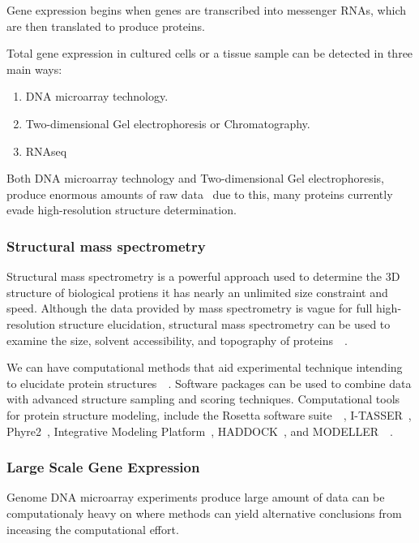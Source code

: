 \documentclass[]{final_report}
\begin{document}
Gene expression begins when genes are transcribed into messenger RNAs, which are then translated to produce proteins. 

Total gene expression in cultured cells or a tissue sample can be detected in three main ways:

\begin{enumerate}
    \item DNA microarray technology.
    \item Two-dimensional Gel electrophoresis or Chromatography.
    \item RNAseq
\end{enumerate}

Both DNA microarray technology and Two-dimensional Gel electrophoresis, produce enormous amounts of raw data~\cite{zvelebil_understanding_2008} due to this, many proteins currently evade high-resolution structure determination.


\subsubsection{Structural mass spectrometry}
Structural mass spectrometry is a powerful approach used to determine the 3D structure of biological protiens it has nearly an unlimited size constraint and speed. Although the data provided by mass spectrometry is vague for full high-resolution structure elucidation, structural mass spectrometry can be used to examine the size, solvent accessibility, and topography of proteins~\cite{limpikirati_covalent_2018}~\cite{liu_mass_2020}.

We can have computational methods that aid experimental technique intending to elucidate protein structures~\cite{seffernick_hybrid_2020}~\cite{leman_macromolecular_2020}. Software packages can be used to combine data with advanced structure sampling and scoring techniques. Computational tools for protein structure modeling, include the Rosetta software suite~\cite{leman_macromolecular_2020}~\cite{alford_rosetta_2017}, I-TASSER~\cite{yang_i-tasser_2015}, Phyre2~\cite{kelley_phyre2_2015}, Integrative Modeling Platform~\cite{russel_putting_2012}, HADDOCK~\cite{dominguez_haddock_2003}, and MODELLER~\cite{eswar_comparative_2006}~\cite{biehn_protein_2022}.

\clearpage
\subsubsection{Large Scale Gene Expression}

Genome DNA microarray experiments produce large amount of data can be computationaly heavy on where methods can yield alternative conclusions from inceasing the computational effort.
\end{document}
